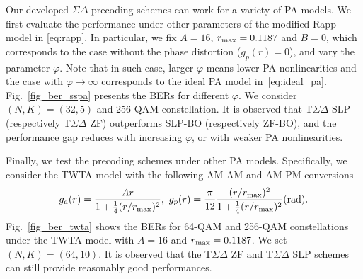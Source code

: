 \documentclass[10pt,twocolumn,twoside]{IEEEtran}
\def\blue{\color{blue}}
\begin{document}
Our developed $\Sigma \Delta$ precoding schemes can work for a variety of PA models.
We first evaluate the performance
under other parameters of the modified Rapp model in \eqref{eq:rapp}.
In particular, we fix $A=16$, $r_{\rm max}=0.1187$ and $B=0$, which corresponds to the case without the phase distortion ($g_p(r)=0$), and vary the parameter $\varphi$.
Note that in such case,  larger $\varphi$ means lower PA nonlinearities
and the case with $\varphi \to \infty$ corresponds to the ideal PA model in~\eqref{eq:ideal_pa}.
Fig.~\ref{fig_ber_sspa} presents the BERs for different $\varphi$.
We consider $(N,K) = (32,5)$ and 256-QAM constellation.
It is observed that T$\Sigma \Delta$ SLP (respectively T$\Sigma \Delta$ ZF) outperforms SLP-BO (respectively ZF-BO), and the performance gap reduces with increasing $\varphi$, or with weaker PA nonlinearities.


Finally, we test the precoding schemes under other PA models.
Specifically, we consider the TWTA model with the following AM-AM and AM-PM conversions
\begin{equation*}
g_a(r) = \frac{Ar}{1+\frac{1}{4}(r/r_{\rm max})^2}, ~
g_p(r) = \frac{\pi}{12} \frac{(r/r_{\rm max})^2}{1+\frac{1}{4}(r/r_{\rm max})^2} ({\rm rad}).
\end{equation*}
Fig.~\ref{fig_ber_twta} shows the BERs for 64-QAM and 256-QAM constellations under the TWTA model with $A=16$ and $r_{\rm max}=0.1187$.
We set $(N,K) = (64,10)$.
It is observed that the T$\Sigma \Delta$ ZF and T$\Sigma \Delta$ SLP schemes can still provide reasonably good performances.
\end{document}
